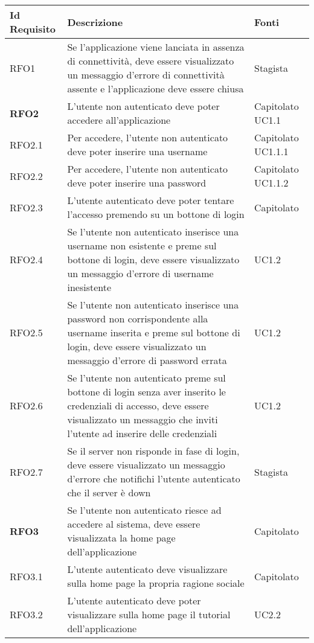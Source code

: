 {\renewcommand{\arraystretch}{2}
\begin{center}
\begin{longtable}{ | >{\centering\arraybackslash}p{2.5cm} | >{\arraybackslash}p{7cm} | >{\centering\arraybackslash}p{2cm} | }
        
\hline
\textbf{Id Requisito} & \textbf{Descrizione} & \textbf{Fonti} \\ \hline
\endhead
RFO1 & Se l'applicazione viene lanciata in assenza di connettività, deve essere visualizzato un messaggio d'errore di connettività assente e l'applicazione deve essere chiusa & Stagista \\ \hline
\textbf{RFO2} & L'utente non autenticato deve poter accedere all'applicazione & Capitolato UC1.1 \\ \hline
RFO2.1 & Per accedere, l'utente non autenticato deve poter inserire una username & Capitolato UC1.1.1 \\ \hline
RFO2.2 & Per accedere, l'utente non autenticato deve poter inserire una password & Capitolato UC1.1.2 \\ \hline
RFO2.3 & L'utente autenticato deve poter tentare l'accesso premendo su un bottone di login & Capitolato\\ \hline
RFO2.4 & Se l'utente non autenticato inserisce una username non esistente e preme sul bottone di login, deve essere visualizzato un messaggio d'errore di username inesistente & UC1.2 \\ \hline
RFO2.5 & Se l'utente non autenticato inserisce una password non corrispondente alla username inserita e preme sul bottone di login, deve essere visualizzato un messaggio d'errore di password errata & UC1.2 \\ \hline
RFO2.6 & Se l'utente non autenticato preme sul bottone di login senza aver inserito le credenziali di accesso, deve essere visualizzato un messaggio che inviti l'utente ad inserire delle credenziali & UC1.2 \\ \hline
RFO2.7 & Se il server non risponde in fase di login, deve essere visualizzato un messaggio d'errore che notifichi l'utente autenticato che il server è down & Stagista \\ \hline
\textbf{RFO3} & Se l'utente non autenticato riesce ad accedere al sistema, deve essere visualizzata la home page dell'applicazione & Capitolato \\ \hline
RFO3.1 & L'utente autenticato deve visualizzare sulla home page la propria ragione sociale & Capitolato \\ \hline
RFO3.2 & L'utente autenticato deve poter visualizzare sulla home page il tutorial dell'applicazione & UC2.2 \\ \hline

\end{longtable}
\end{center}}
